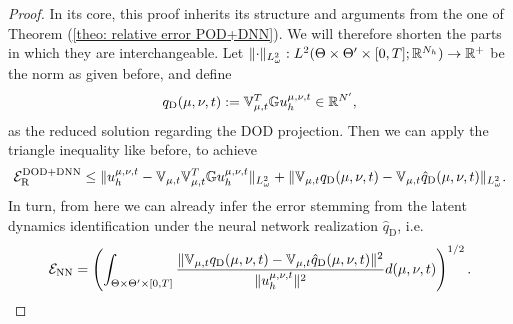 \begin{proof}
    
    In its core, this proof inherits its structure and arguments from the one of Theorem 
    (\ref{theo: relative error POD+DNN}).
    We will therefore shorten the parts in which they are interchangeable. Let 
    $\lVert \cdot \rVert_{L^2_\omega}: L^2(\Theta \times \Theta' \times [0, T]; \mathbb{R}^{N_h}) \to \mathbb{R}^+$ be the norm as given before,
    and define
    \begin{equation*}
        q_\text{D}(\mu, \nu, t) := \mathbb{V}_{\mu, t}^T \mathbb{G} u_h^{\mu, \nu, t} \in \mathbb{R}^{N'}, 
    \end{equation*}
    as the reduced solution regarding the DOD projection.
    Then we can apply the triangle inequality like before, to achieve 
    \begin{equation*}
        \mathcal{E}_\text{R}^\text{DOD+DNN} \leq \lVert u_h^{\mu, \nu, t} - \mathbb{V}_{\mu, t} \mathbb{V}_{\mu, t}^T \mathbb{G} u_h^{\mu, \nu, t} \rVert_{L^2_\omega} + 
        \lVert \mathbb{V}_{\mu, t} q_\text{D}(\mu, \nu, t) - \mathbb{V}_{\mu, t} \hat{q}_\text{D}(\mu, \nu, t) \rVert_{L^2_\omega}.
    \end{equation*}
    In turn, from here we can already infer the error stemming from the latent dynamics identification under the 
    neural network realization $\hat{q}_\text{D}$, i.e.
    \begin{equation}
        \mathcal{E}_\text{NN} = \left( \int_{\Theta \times \Theta' \times [0, T]} 
        \frac{\lVert \mathbb{V}_{\mu, t} q_\text{D}(\mu, \nu, t) - \mathbb{V}_{\mu, t} \hat{q}_\text{D}(\mu, \nu, t) \rVert^2}{\lVert u_h^{\mu, \nu, t} \rVert^2} 
        d(\mu, \nu, t) \right)^{1/2}.
    \end{equation}
    

\end{proof}
